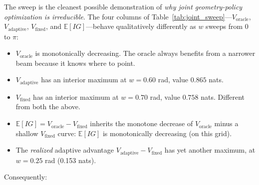 \documentclass[11pt,a4paper]{article}
\newcommand{\E}{\mathbb{E}}
\begin{document}
The sweep is the cleanest possible demonstration of \emph{why joint geometry-policy optimization is irreducible}.  The four columns of Table~\ref{tab:joint_sweep}---$V_{\text{oracle}}$, $V_{\text{adaptive}}$, $V_{\text{fixed}}$, and $\E[IG]$---behave qualitatively differently as $w$ sweeps from 0 to $\pi$:
\begin{itemize}[nosep]
\item $V_{\text{oracle}}$ is monotonically decreasing.  The oracle always benefits from a narrower beam because it knows where to point.
\item $V_{\text{adaptive}}$ has an interior maximum at $w = 0.60$ rad, value $0.865$ nats.
\item $V_{\text{fixed}}$ has an interior maximum at $w = 0.70$ rad, value $0.758$ nats.  Different from both the above.
\item $\E[IG] = V_{\text{oracle}} - V_{\text{fixed}}$ inherits the monotone decrease of $V_{\text{oracle}}$ minus a shallow $V_{\text{fixed}}$ curve: $\E[IG]$ is monotonically decreasing (on this grid).
\item The \emph{realized} adaptive advantage $V_{\text{adaptive}} - V_{\text{fixed}}$ has yet another maximum, at $w = 0.25$ rad (0.153 nats).
\end{itemize}

Consequently:
\end{document}
